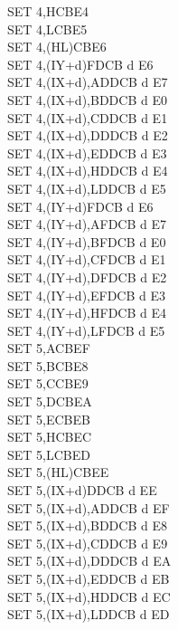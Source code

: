 \begin{multicols}{3}
{\begin{tabbing}
        SET 4,H\>CBE4\\
        SET 4,L\>CBE5\\
        SET 4,(HL)\>CBE6\\
        SET 4,(IY+d)\>FDCB d E6\\
        SET 4,(IX+d),A\UNDOC\>DDCB d E7\\
        SET 4,(IX+d),B\UNDOC\>DDCB d E0\\
        SET 4,(IX+d),C\UNDOC\>DDCB d E1\\
        SET 4,(IX+d),D\UNDOC\>DDCB d E2\\
        SET 4,(IX+d),E\UNDOC\>DDCB d E3\\
        SET 4,(IX+d),H\UNDOC\>DDCB d E4\\
        SET 4,(IX+d),L\UNDOC\>DDCB d E5\\
        SET 4,(IY+d)\>FDCB d E6\\
        SET 4,(IY+d),A\UNDOC\>FDCB d E7\\
        SET 4,(IY+d),B\UNDOC\>FDCB d E0\\
        SET 4,(IY+d),C\UNDOC\>FDCB d E1\\
        SET 4,(IY+d),D\UNDOC\>FDCB d E2\\
        SET 4,(IY+d),E\UNDOC\>FDCB d E3\\
        SET 4,(IY+d),H\UNDOC\>FDCB d E4\\
        SET 4,(IY+d),L\UNDOC\>FDCB d E5\\
        SET 5,A\>CBEF\\
        SET 5,B\>CBE8\\
        SET 5,C\>CBE9\\
        SET 5,D\>CBEA\\
        SET 5,E\>CBEB\\
        SET 5,H\>CBEC\\
        SET 5,L\>CBED\\
        SET 5,(HL)\>CBEE\\
        SET 5,(IX+d)\>DDCB d EE\\
        SET 5,(IX+d),A\UNDOC\>DDCB d EF\\
        SET 5,(IX+d),B\UNDOC\>DDCB d E8\\
        SET 5,(IX+d),C\UNDOC\>DDCB d E9\\
        SET 5,(IX+d),D\UNDOC\>DDCB d EA\\
        SET 5,(IX+d),E\UNDOC\>DDCB d EB\\
        SET 5,(IX+d),H\UNDOC\>DDCB d EC\\
        SET 5,(IX+d),L\UNDOC\>DDCB d ED\\

\end{tabbing}}
\end{multicols}
